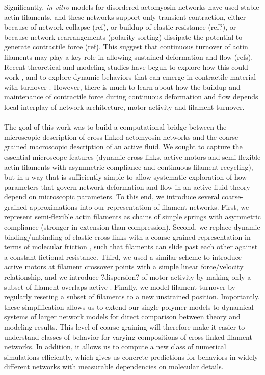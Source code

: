 \documentclass[10pt,letterpaper]{article}
\begin{document}
Significantly, {\em in vitro} models for disordered actomyosin networks have used stable actin filaments, and these networks  support only transient contraction, either because of network collapse (ref), or buildup of elastic resistance (ref?), or because network rearrangements (polarity sorting) dissipate the potential to generate contractile force (ref). This suggest that continuous turnover of actin filaments may play a key role in allowing sustained deformation and flow (refs). Recent theoretical and modeling studies have begun to explore how this could work \cite{2015arXiv150706182H,Mak:2016aa,10.1371/journal.pone.0000696}, and to explore dynamic behaviors that can emerge in contractile material with turnover \cite{PhysRevLett.113.148102}. However, there is much to learn about how the buildup and maintenance of contractile force during continuous deformation and flow depends local interplay of network architecture, motor activity and filament turnover.



\paragraph{}  The goal of this work was to build a computational bridge between the microscopic description of cross-linked actomyosin networks and the coarse grained macroscopic description of an active fluid.  We sought to capture the essential microscope features (dynamic cross-links, active motors and semi flexible actin filaments with asymmetric compliance and continuous filament recycling), but in a way that is sufficiently simple to allow systematic exploration of how parameters that govern network deformation and flow in an active fluid theory depend on microscopic parameters. To this end, we introduce several coarse-grained approximations into our representation of filament networks. First, we represent semi-flexible actin filaments as chains of simple springs with asymmetric compliance (stronger in extension than compression). Second, we replace  dynamic binding/unbinding of elastic cross-links with a coarse-grained representation in terms of molecular friction \cite{theo_friction,theo_frictionSam,theo_molefric}, such that filaments can slide past each other against a constant fictional resistance. Third, we used a similar scheme to introduce active motors at filament crossover points with a simple linear force/velocity relationship, and we introduce ?dispersion? of motor activity by making only a subset of filament overlaps active \cite{theo_frictionShila}.  Finally, we model filament turnover by regularly reseting a subset of filaments to a new unstrained position. Importantly, these simplification allows us to extend our single polymer models to dynamical systems of larger network models for direct comparison between theory and modeling results. This level of coarse graining will therefore make it easier to understand classes of behavior for varying compositions of cross-linked filament networks. In addition, it allows us to compute a new class of numerical simulations efficiently, which gives us concrete predictions for behaviors in widely different networks with measurable dependencies on molecular details. 
  
\end{document}
